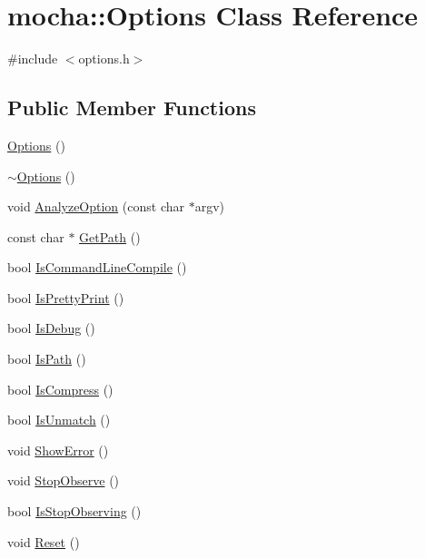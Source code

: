 \hypertarget{classmocha_1_1_options}{
\section{mocha::Options Class Reference}
\label{classmocha_1_1_options}
}


{\ttfamily \#include $<$options.h$>$}

\subsection*{Public Member Functions}
\begin{DoxyCompactItemize}
\item 
\hyperlink{classmocha_1_1_options_abb6a471304a735b90e69aafbdb35cd8c}{Options} ()
\item 
\hyperlink{classmocha_1_1_options_a9d15ed9445cde1877cd75cf35d10f0b2}{$\sim$Options} ()
\item 
void \hyperlink{classmocha_1_1_options_a0a0a01e7742117035f71638ec7d3b1c2}{AnalyzeOption} (const char $\ast$argv)
\item 
const char $\ast$ \hyperlink{classmocha_1_1_options_a0abbb408e7bb9a99963760c6dfd2478b}{GetPath} ()
\item 
bool \hyperlink{classmocha_1_1_options_a6800974f0eca552d43c944b3a90d3bc5}{IsCommandLineCompile} ()
\item 
bool \hyperlink{classmocha_1_1_options_abe3689c77e5303396847d17f951ecbfb}{IsPrettyPrint} ()
\item 
bool \hyperlink{classmocha_1_1_options_a0165140c0617b6e8102a99635cd27350}{IsDebug} ()
\item 
bool \hyperlink{classmocha_1_1_options_a12fca4365f5ec25c4037d6c430aa3378}{IsPath} ()
\item 
bool \hyperlink{classmocha_1_1_options_a928c7ea852dd6a5ed1d01f81f8262117}{IsCompress} ()
\item 
bool \hyperlink{classmocha_1_1_options_a93b8bf848e6cdd3c346328f3d30816c1}{IsUnmatch} ()
\item 
void \hyperlink{classmocha_1_1_options_accb5dfe2f49dc2258f1c5e5897d1c3ca}{ShowError} ()
\item 
void \hyperlink{classmocha_1_1_options_aba0218b78790d4c265d3051da436b5f5}{StopObserve} ()
\item 
bool \hyperlink{classmocha_1_1_options_a16982328e501cd6308f72ac2328b42a1}{IsStopObserving} ()
\item 
void \hyperlink{classmocha_1_1_options_a9901e7ea6418f11841ab96a4e9dec763}{Reset} ()
\end{DoxyCompactItemize}
